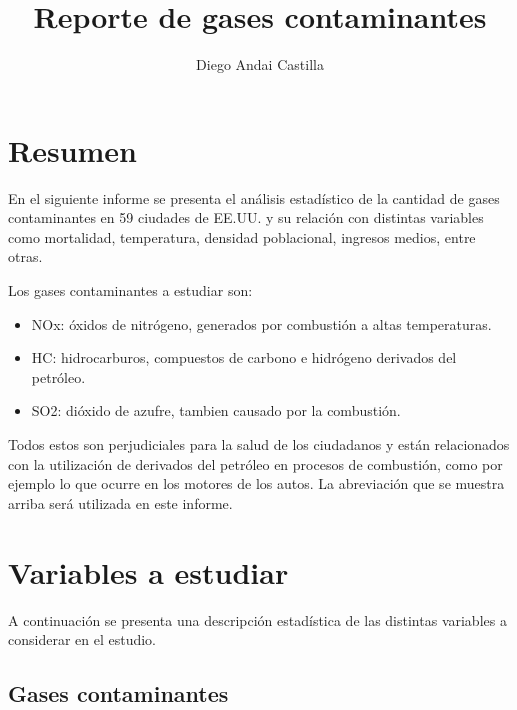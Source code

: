 \documentclass[11pt]{article}
\begin{document}
%
\author{Diego Andai Castilla}
\title{Reporte de gases contaminantes}
\maketitle

\section{Resumen}

En el siguiente informe se presenta el análisis estadístico de la cantidad de gases contaminantes en 59 ciudades de EE.UU. y su relación con distintas variables como mortalidad, temperatura, densidad poblacional, ingresos medios, entre otras.

Los gases contaminantes a estudiar son:

\begin{itemize}
    \item NOx: óxidos de nitrógeno, generados por combustión a altas temperaturas.
    \item HC: hidrocarburos, compuestos de carbono e hidrógeno derivados del petróleo.
    \item SO2: dióxido de azufre, tambien causado por la combustión.
\end{itemize}

Todos estos son perjudiciales para la salud de los ciudadanos y están relacionados con la utilización de derivados del petróleo en procesos de combustión, como por ejemplo lo que ocurre en los motores de los autos. La abreviación que se muestra arriba será utilizada en este informe.

\section{Variables a estudiar}

A continuación se presenta una descripción estadística de las distintas variables a considerar en el estudio.

\subsection{Gases contaminantes}
\end{document}
